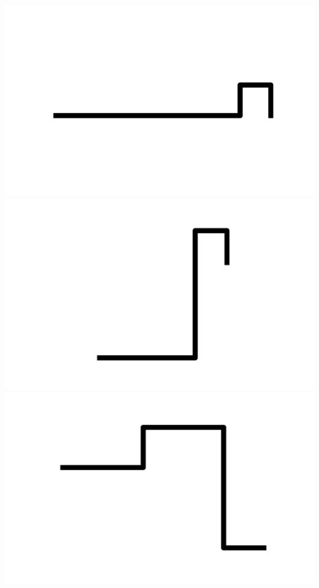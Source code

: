 \documentclass[]{report}
\begin{document}
\includegraphics[scale=.1]{pictures/21/state_cluster_shapes_250.pdf} 
\includegraphics[scale=.1]{pictures/21/state_cluster_shapes_251.pdf} 
\includegraphics[scale=.1]{pictures/21/state_cluster_shapes_252.pdf} 
\end{document}
